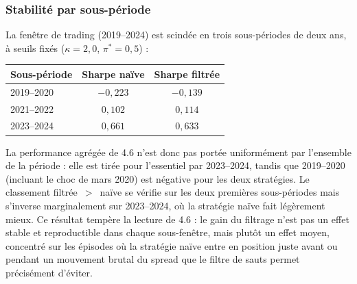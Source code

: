 \documentclass{article}
\begin{document}
\subsubsection*{Stabilité par sous-période}
La fenêtre de trading (2019--2024) est scindée en trois sous-périodes de deux ans, à seuils fixés ($\kappa=2{,}0$, $\pi^\ast=0{,}5$) :
\begin{center}
\begin{tabular}{lcc}
\toprule
Sous-période & Sharpe naïve & Sharpe filtrée \\
\midrule
2019--2020 & $-0{,}223$ & $-0{,}139$ \\
2021--2022 & $0{,}102$ & $0{,}114$ \\
2023--2024 & $0{,}661$ & $0{,}633$ \\
\bottomrule
\end{tabular}
\end{center}
La performance agrégée de 4.6 n'est donc pas portée uniformément par l'ensemble de la période : elle est tirée pour l'essentiel par 2023--2024, tandis que 2019--2020 (incluant le choc de mars 2020) est négative pour les deux stratégies. Le classement filtrée~$>$~naïve se vérifie sur les deux premières sous-périodes mais s'inverse marginalement sur 2023--2024, où la stratégie naïve fait légèrement mieux. Ce résultat tempère la lecture de 4.6 : le gain du filtrage n'est pas un effet stable et reproductible dans chaque sous-fenêtre, mais plutôt un effet moyen, concentré sur les épisodes où la stratégie naïve entre en position juste avant ou pendant un mouvement brutal du spread que le filtre de sauts permet précisément d'éviter.
\end{document}
